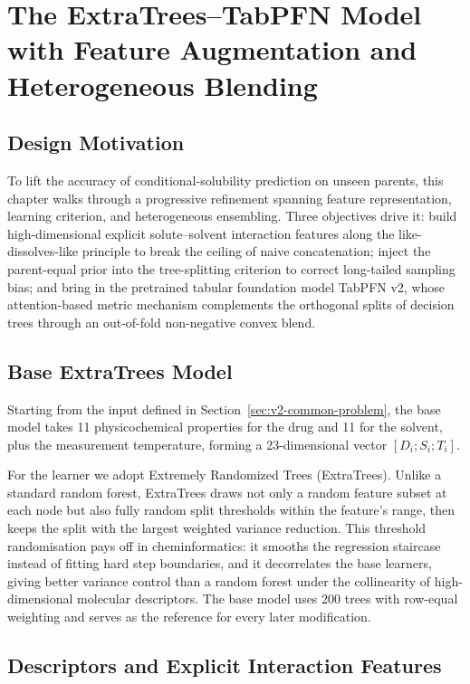 \section{The ExtraTrees--TabPFN Model with Feature Augmentation and Heterogeneous Blending}\label{sec:v2-methods}

\subsection{Design Motivation}

To lift the accuracy of conditional-solubility prediction on unseen parents, this chapter walks through a progressive refinement spanning feature representation, learning criterion, and heterogeneous ensembling. Three objectives drive it: build high-dimensional explicit solute--solvent interaction features along the like-dissolves-like principle to break the ceiling of naive concatenation; inject the parent-equal prior into the tree-splitting criterion to correct long-tailed sampling bias; and bring in the pretrained tabular foundation model TabPFN v2, whose attention-based metric mechanism complements the orthogonal splits of decision trees through an out-of-fold non-negative convex blend.

\subsection{Base ExtraTrees Model}

Starting from the input defined in Section~\ref{sec:v2-common-problem}, the base model takes 11 physicochemical properties for the drug and 11 for the solvent, plus the measurement temperature, forming a 23-dimensional vector $[D_i; S_i; T_i]$.

For the learner we adopt Extremely Randomized Trees (ExtraTrees\cite{extratrees2006}). Unlike a standard random forest, ExtraTrees draws not only a random feature subset at each node but also fully random split thresholds within the feature's range, then keeps the split with the largest weighted variance reduction. This threshold randomisation pays off in cheminformatics: it smooths the regression staircase instead of fitting hard step boundaries, and it decorrelates the base learners, giving better variance control than a random forest under the collinearity of high-dimensional molecular descriptors. The base model uses 200 trees with row-equal weighting and serves as the reference for every later modification.

\subsection{Descriptors and Explicit Interaction Features}

